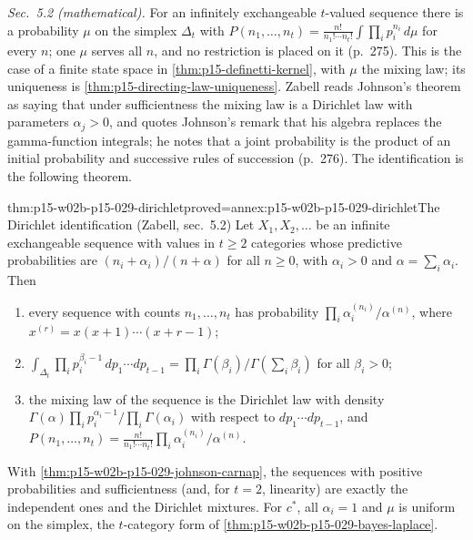 \emph{Sec.~5.2 (mathematical).} For an infinitely exchangeable
\(t\)-valued sequence there is a probability \(\mu\) on the simplex
\(\Delta_t\) with
\(P(n_1,\ldots,n_t)=\frac{n!}{n_1!\cdots n_t!}\int\prod_ip_i^{n_i}\,d\mu\)
for every \(n\); one \(\mu\) serves all \(n\), and no restriction is
placed on it (p.~275). This is the case of a finite state space in
\cref{thm:p15-definetti-kernel}, with \(\mu\) the mixing law; its
uniqueness is \cref{thm:p15-directing-law-uniqueness}. Zabell reads
Johnson's theorem as saying that under sufficientness the mixing law is
a Dirichlet law with parameters \(\alpha_j>0\), and quotes Johnson's
remark that his algebra replaces the gamma-function integrals; he notes
that a joint probability is the product of an initial probability and
successive rules of succession (p.~276). The identification is the
following theorem.

\begin{hbtheorem}{thm:p15-w02b-p15-029-dirichlet}{proved=annex:p15-w02b-p15-029-dirichlet}{The Dirichlet identification (Zabell, sec.~5.2)}
Let \(X_1,X_2,\ldots\) be an infinite exchangeable sequence with values
in \(t\geq2\) categories whose predictive probabilities are
\((n_i+\alpha_i)/(n+\alpha)\) for all \(n\geq0\), with \(\alpha_i>0\)
and \(\alpha=\sum_i\alpha_i\). Then
\begin{enumerate}
 \item every sequence with counts \(n_1,\ldots,n_t\) has probability
       \(\prod_i\alpha_i^{(n_i)}/\alpha^{(n)}\), where
       \(x^{(r)}=x(x+1)\cdots(x+r-1)\);
 \item \(\int_{\Delta_t}\prod_ip_i^{\beta_i-1}\,dp_1\cdots dp_{t-1}
       =\prod_i\Gamma(\beta_i)/\Gamma(\sum_i\beta_i)\) for all
       \(\beta_i>0\);
 \item the mixing law of the sequence is the Dirichlet law with density
       \(\Gamma(\alpha)\prod_ip_i^{\alpha_i-1}/\prod_i\Gamma(\alpha_i)\)
       with respect to \(dp_1\cdots dp_{t-1}\), and
       \(P(n_1,\ldots,n_t)=\frac{n!}{n_1!\cdots n_t!}\prod_i\alpha_i^{(n_i)}/\alpha^{(n)}\).
\end{enumerate}
\end{hbtheorem}

With \cref{thm:p15-w02b-p15-029-johnson-carnap}, the sequences with
positive probabilities and sufficientness (and, for \(t=2\), linearity)
are exactly the independent ones and the Dirichlet mixtures. For
\(c^*\), all \(\alpha_i=1\) and \(\mu\) is uniform on the simplex, the
\(t\)-category form of \cref{thm:p15-w02b-p15-029-bayes-laplace}.

